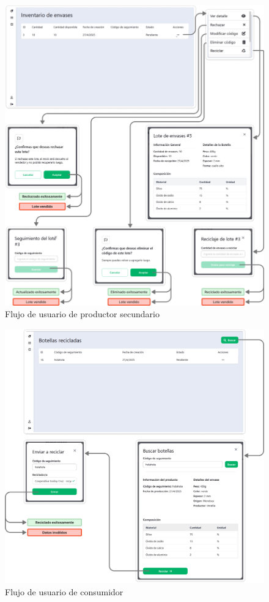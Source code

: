 \begin{figure}[!htb]
	\centering
	\includegraphics[width=\linewidth]{Figures/flow-secondary-producer.png}
	\caption{Flujo de usuario de productor secundario}
  \label{fig:flow-secondary-producer}
\end{figure}

\begin{figure}[!htb]
	\centering
	\includegraphics[width=\linewidth]{Figures/flow-consumer.png}
	\caption{Flujo de usuario de consumidor}
  \label{fig:flow-consumer}
\end{figure}

